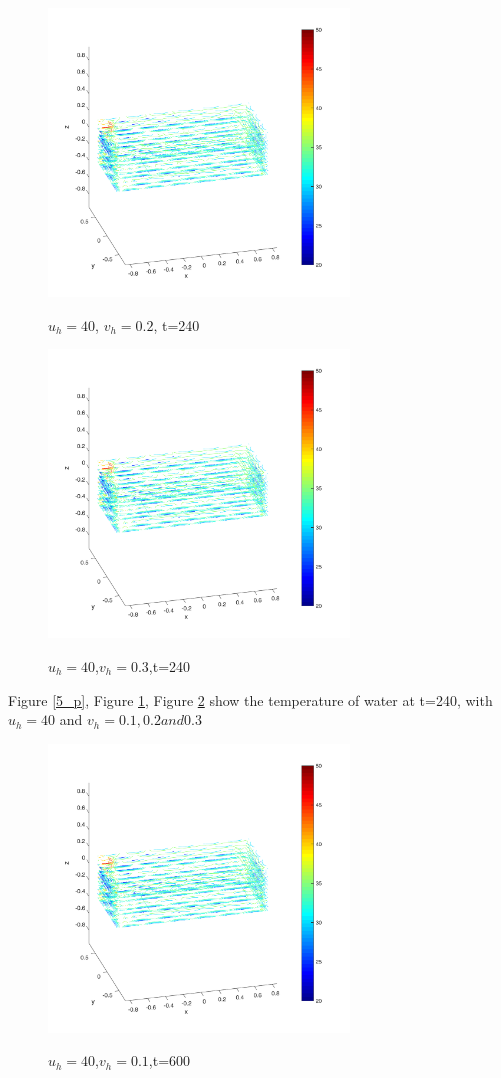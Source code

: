 \documentclass[12pt,a4paper,titlepage]{article}
\begin{document}
\begin{figure}[htb]
  \centering
  \includegraphics[width=8cm]{10-2.pdf}\\
  \caption{$u_h=40$, $v_h=0.2$, t=240}\label{6_p}
\end{figure}

\begin{figure}[htb]
  \centering
  \includegraphics[width=8cm]{11-2.pdf}\\
  \caption{$u_h=40$,$v_h=0.3$,t=240}\label{7_p}
\end{figure}


Figure \ref{5_p}, Figure \ref{6_p}, Figure \ref{7_p} show the temperature of water at t=240, with $u_h=40$ and $v_h=0.1, 0.2 and 0.3$


\begin{figure}[htb]
  \centering
  \includegraphics[width=8cm]{6-5.pdf}\\
  \caption{$u_h=40$,$v_h=0.1$,t=600}\label{8_p}
\end{figure}
\end{document}
